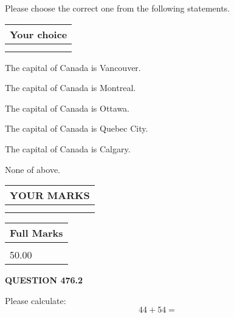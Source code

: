 \documentclass[12pt]{article}
\begin{document}
  
Please choose the correct one from the following statements.
  
  
\noindent\hspace{3.0in} \begin{tabular}{|l|}
\hline
Your choice \\
\hline
 \\ 
 \\ 
\hline
\end{tabular}
  
  
 
 
The capital of Canada is Vancouver.
 
 
The capital of Canada is Montreal.
 
 
The capital of Canada is Ottawa.
 
 
The capital of Canada is Quebec City.
 
 
The capital of Canada is Calgary.
 
 
 None of above.
 
 
  
\vspace{0.2in}
  
\noindent\begin{tabular}{|l|}
\hline
 YOUR MARKS  \\
\hline
 \\ 
 \\ 
\hline
\end{tabular}
\hspace{0.05in} \begin{tabular}{|l|}
\hline
 Full Marks  \\
\hline
 \\ 
50.00 \\
\hline
\end{tabular}
{\textbf{\Large{QUESTION
476.2 
}}}
  
  
 
Please calculate:
\begin{equation}
44 +  %
54 = \nonumber
\end{equation}
 

 

 
   
   
 \vspace{0.2in}
 
   
   
   
   
\end{document}
